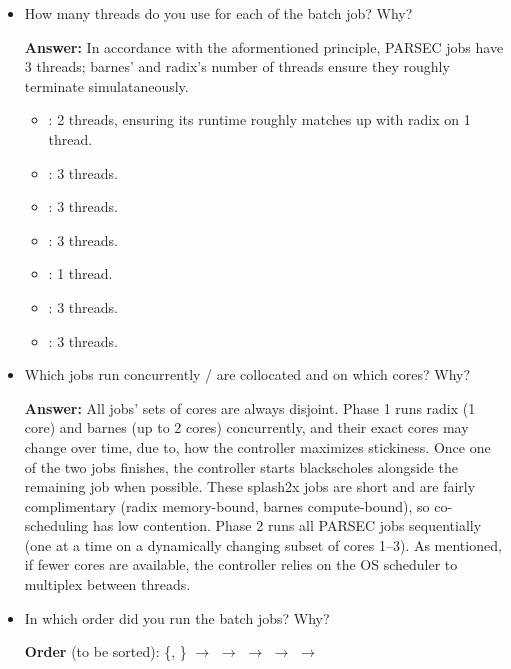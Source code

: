 \begin{enumerate}
\begin{itemize}
    \item How many threads do you use for each of the batch job? Why?
    
    \textbf{Answer:}
    In accordance with the aformentioned principle, PARSEC jobs have 3 threads; barnes' and radix's number of threads ensure they roughly terminate simulataneously.
    \begin{itemize}
        \item {}: 2 threads, ensuring its runtime roughly matches up with radix on 1 thread.

        \item {}: 3 threads.

        \item {}: 3 threads.

        \item {}: 3 threads.

        \item {}: 1 thread.

        \item {}: 3 threads.

        \item {}: 3 threads.
        \\
    \end{itemize}
      
    \item Which jobs run concurrently / are collocated and on which cores? Why?

    \textbf{Answer:}
    All jobs' sets of cores are always disjoint. Phase 1 runs radix (1 core) and barnes (up to 2 cores) concurrently, and their exact cores may change over time, due to, how the controller maximizes stickiness. Once one of the two jobs finishes, the controller starts blackscholes alongside the remaining job when possible. These splash2x jobs are short and are fairly complimentary (radix memory-bound, barnes compute-bound), so co-scheduling has low contention. Phase 2 runs all PARSEC jobs sequentially (one at a time on a dynamically changing subset of cores 1--3). As mentioned, if fewer cores are available, the controller relies on the OS scheduler to multiplex between threads.
    \\
    
    \item In which order did you run the batch jobs? Why?

    \textbf{Order} (to be sorted): %
    \{, \} $\to$  $\to$  $\to$  $\to$  $\to$ 
    

\end{itemize}
\end{enumerate}
